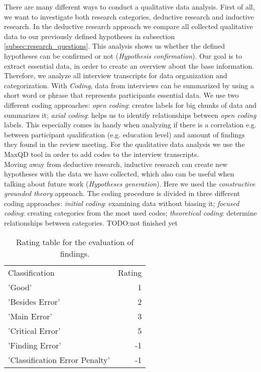 There are many different ways to conduct a qualitative data analysis. First of all, we want to investigate both research categories, deductive research and inductive research.
In the deductive research approach we compare all collected qualitative data to our previously defined hypotheses in subsection \ref{subsec:research_questions}. This analysis shows us whether the defined hypotheses can be confirmed or not (\textit{Hypothesis confirmation}). Our goal is to extract essential data, in order to create an overview about the base information. Therefore, we analyze all interview transcripts for data organization and categorization. With \textit{Coding}, data from interviews can be summarized by using a short word or phrase that represents participants essential data. We use two different coding approaches: \textit{open coding}: creates labels for big chunks of data and summarizes it; \textit{axial coding}: helps us to identify relationships between \textit{open coding} labels. This especially comes in handy when analyzing if there is a correlation e.g. between participant qualification (e.g. education level) and amount of findings they found in the review meeting. For the qualitative data analysis we use the MaxQD tool in order to add codes to the interview transcripts. \\
Moving away from deductive research, inductive research can create new hypotheses with the data we have collected, which also can be useful when talking about future work (\textit{Hypotheses generation}). Here we used the \textit{constructive grounded theory} approach. The coding procedure is divided in three different coding approaches: \textit{initial coding}: examining data without biasing it; \textit{focused coding}: creating categories from the most used codes; \textit{theoretical coding}: determine relationships between categories.
TODO:not finished yet

\begin{table}
\centering
\begin{tabular}{lr}
  \rowcolor{heading}Classification & Rating \\
  \rowcolor{a}'Good' & 1 \\
  \rowcolor{b}'Besides Error' & 2 \\
  \rowcolor{a}'Main Error' & 3 \\
  \rowcolor{b}'Critical Error' & 5 \\
  \rowcolor{a}'Finding Error' & -1 \\
  \rowcolor{b}'Classification Error Penalty' & -1 \\
\end{tabular}
\caption{Rating table for the evaluation of findings.}
\label{tab:ratings}
\end{table}


